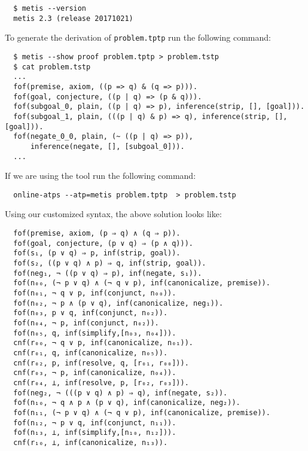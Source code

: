 \documentclass[../main.tex]{subfiles}
\begin{document}
\begin{subappendices}
\begin{verbatim}
  $ metis --version
  metis 2.3 (release 20171021)
\end{verbatim}

To generate the \TSTP derivation of \verb!problem.tptp!
run the following command:

\begin{verbatim}
  $ metis --show proof problem.tptp > problem.tstp
  $ cat problem.tstp
  ...
  fof(premise, axiom, ((p => q) & (q => p))).
  fof(goal, conjecture, ((p | q) => (p & q))).
  fof(subgoal_0, plain, ((p | q) => p), inference(strip, [], [goal])).
  fof(subgoal_1, plain, (((p | q) & p) => q), inference(strip, [], [goal])).
  fof(negate_0_0, plain, (~ ((p | q) => p)),
      inference(negate, [], [subgoal_0])).
  ...
\end{verbatim}

If we are using the  tool run the following command:

\begin{verbatim}
  online-atps --atp=metis problem.tptp  > problem.tstp
\end{verbatim}

Using our customized \TSTP syntax, the above \Metis solution looks like:

\begin{verbatim}
  fof(premise, axiom, (p ⇒ q) ∧ (q ⇒ p)).
  fof(goal, conjecture, (p ∨ q) ⇒ (p ∧ q))).
  fof(s₁, (p ∨ q) ⇒ p, inf(strip, goal)).
  fof(s₂, ((p ∨ q) ∧ p) ⇒ q, inf(strip, goal)).
  fof(neg₁, ¬ ((p ∨ q) ⇒ p), inf(negate, s₁)).
  fof(n₀₀, (¬ p ∨ q) ∧ (¬ q ∨ p), inf(canonicalize, premise)).
  fof(n₀₁, ¬ q ∨ p, inf(conjunct, n₀₀)).
  fof(n₀₂, ¬ p ∧ (p ∨ q), inf(canonicalize, neg₁)).
  fof(n₀₃, p ∨ q, inf(conjunct, n₀₂)).
  fof(n₀₄, ¬ p, inf(conjunct, n₀₂)).
  fof(n₀₅, q, inf(simplify,[n₀₃, n₀₄])).
  cnf(r₀₀, ¬ q ∨ p, inf(canonicalize, n₀₁)).
  cnf(r₀₁, q, inf(canonicalize, n₀₅)).
  cnf(r₀₂, p, inf(resolve, q, [r₀₁, r₀₀])).
  cnf(r₀₃, ¬ p, inf(canonicalize, n₀₄)).
  cnf(r₀₄, ⊥, inf(resolve, p, [r₀₂, r₀₃])).
  fof(neg₂, ¬ (((p ∨ q) ∧ p) ⇒ q), inf(negate, s₂)).
  fof(n₁₀, ¬ q ∧ p ∧ (p ∨ q), inf(canonicalize, neg₂)).
  fof(n₁₁, (¬ p ∨ q) ∧ (¬ q ∨ p), inf(canonicalize, premise)).
  fof(n₁₂, ¬ p ∨ q, inf(conjunct, n₁₁)).
  fof(n₁₃, ⊥, inf(simplify,[n₁₀, n₁₂])).
  cnf(r₁₀, ⊥, inf(canonicalize, n₁₃)).
\end{verbatim}


\end{subappendices}
\end{document}
